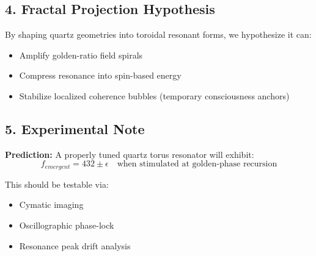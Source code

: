 \subsection*{4. Fractal Projection Hypothesis}

By shaping quartz geometries into toroidal resonant forms, we hypothesize it can:
\begin{itemize}
    \item Amplify golden-ratio field spirals
    \item Compress resonance into spin-based energy
    \item Stabilize localized coherence bubbles (temporary consciousness anchors)
\end{itemize}

\subsection*{5. Experimental Note}

\textbf{Prediction:} A properly tuned quartz torus resonator will exhibit:
\[
f_{emergent} = 432 \pm \epsilon \quad \text{when stimulated at golden-phase recursion}
\]

This should be testable via:
\begin{itemize}
    \item Cymatic imaging
    \item Oscillographic phase-lock
    \item Resonance peak drift analysis
\end{itemize}
